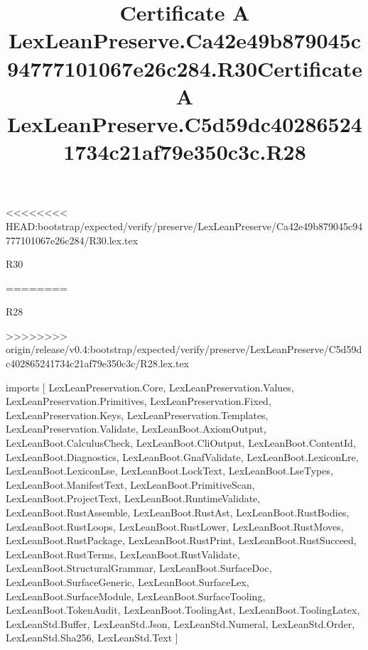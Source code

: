 <<<<<<<< HEAD:bootstrap/expected/verify/preserve/LexLeanPreserve/Ca42e49b879045c94777101067e26c284/R30.lex.tex
\begin{lexlean}{R30}
\title{Certificate A LexLeanPreserve.Ca42e49b879045c94777101067e26c284.R30}
========
\begin{lexlean}{R28}
\title{Certificate A LexLeanPreserve.C5d59dc402865241734c21af79e350c3c.R28}
>>>>>>>> origin/release/v0.4:bootstrap/expected/verify/preserve/LexLeanPreserve/C5d59dc402865241734c21af79e350c3c/R28.lex.tex
\begin{coremodule}
imports [
  LexLeanPreservation.Core,
  LexLeanPreservation.Values,
  LexLeanPreservation.Primitives,
  LexLeanPreservation.Fixed,
  LexLeanPreservation.Keys,
  LexLeanPreservation.Templates,
  LexLeanPreservation.Validate,
  LexLeanBoot.AxiomOutput,
  LexLeanBoot.CalculusCheck,
  LexLeanBoot.CliOutput,
  LexLeanBoot.ContentId,
  LexLeanBoot.Diagnostics,
  LexLeanBoot.GnafValidate,
  LexLeanBoot.LexiconLre,
  LexLeanBoot.LexiconLse,
  LexLeanBoot.LockText,
  LexLeanBoot.LseTypes,
  LexLeanBoot.ManifestText,
  LexLeanBoot.PrimitiveScan,
  LexLeanBoot.ProjectText,
  LexLeanBoot.RuntimeValidate,
  LexLeanBoot.RustAssemble,
  LexLeanBoot.RustAst,
  LexLeanBoot.RustBodies,
  LexLeanBoot.RustLoops,
  LexLeanBoot.RustLower,
  LexLeanBoot.RustMoves,
  LexLeanBoot.RustPackage,
  LexLeanBoot.RustPrint,
  LexLeanBoot.RustSucceed,
  LexLeanBoot.RustTerms,
  LexLeanBoot.RustValidate,
  LexLeanBoot.StructuralGrammar,
  LexLeanBoot.SurfaceDoc,
  LexLeanBoot.SurfaceGeneric,
  LexLeanBoot.SurfaceLex,
  LexLeanBoot.SurfaceModule,
  LexLeanBoot.SurfaceTooling,
  LexLeanBoot.TokenAudit,
  LexLeanBoot.ToolingAst,
  LexLeanBoot.ToolingLatex,
  LexLeanStd.Buffer,
  LexLeanStd.Json,
  LexLeanStd.Numeral,
  LexLeanStd.Order,
  LexLeanStd.Sha256,
  LexLeanStd.Text
]


\end{coremodule}
\end{lexlean}
\end{lexlean}
